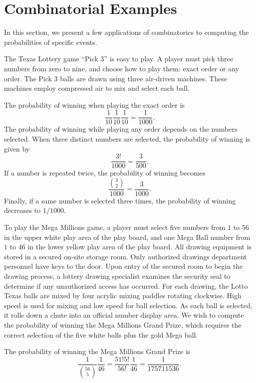 \section{Combinatorial Examples}

In this section, we present a few applications of combinatorics to computing the probabilities of specific events.

\begin{example}
The Texas Lottery game ``Pick $3$'' is easy to play.
A player must pick three numbers from zero to nine, and choose how to play them: exact order or any order.
The Pick $3$ balls are drawn using three air-driven machines.
These machines employ compressed air to mix and select each ball.

The probability of winning when playing the exact order is
\begin{equation*}
\frac{1}{10} \frac{1}{10} \frac{1}{10}
= \frac{1}{1000} .
\end{equation*}
The probability of winning while playing any order depends on the numbers selected.
When three distinct numbers are selected, the probability of winning is given by
\begin{equation*}
\frac{3!}{1000} = \frac{3}{500} .
\end{equation*}
If a number is repeated twice, the probability of winning becomes
\begin{equation*}
\frac{\binom{3}{2}}{1000} = \frac{3}{1000} .
\end{equation*}
Finally, if a same number is selected three times, the probability of winning decreases to $1/1000$.
\end{example}

\begin{example}
To play the Mega Millions game, a player must select five numbers from $1$ to $56$ in the upper white play area of the play board, and one Mega Ball number from $1$ to $46$ in the lower yellow play area of the play board.
All drawing equipment is stored in a secured on-site storage room.
Only authorized drawings department personnel have keys to the door.
Upon entry of the secured room to begin the drawing process, a lottery drawing specialist examines the security seal to determine if any unauthorized access has occurred.
For each drawing, the Lotto Texas balls are mixed by four acrylic mixing paddles rotating clockwise.
High speed is used for mixing and low speed for ball selection.
As each ball is selected, it rolls down a chute into an official number display area.
We wish to compute the probability of winning the Mega Millions Grand Prize, which requires the correct selection of the five white balls plus the gold Mega ball.

The probability of winning the Mega Millions Grand Prize is
\begin{equation*}
\frac{1}{\binom{56}{5}} \frac{1}{46}
= \frac{51!5!}{56!} \frac{1}{46}
= \frac{1}{175 711 536} .
\end{equation*}
\end{example}


